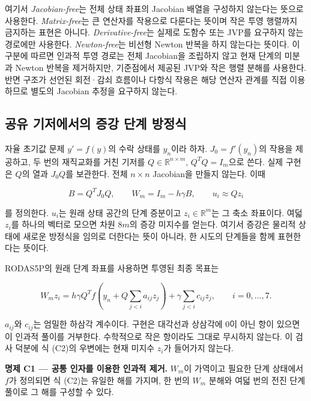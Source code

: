 \documentclass[
  10pt,
  dvipsnames]{article}
\begin{document}
여기서 \emph{Jacobian-free}는 전체 상태 좌표의 Jacobian 배열을 구성하지
않는다는 뜻으로 사용한다. \emph{Matrix-free}는 큰 연산자를 작용으로
다룬다는 뜻이며 작은 투영 행렬까지 금지하는 표현은 아니다.
\emph{Derivative-free}는 실제로 도함수 또는 JVP를 요구하지 않는 경로에만
사용한다. \emph{Newton-free}는 비선형 Newton 반복을 하지 않는다는
뜻이다. 이 구분에 따르면 인과적 투영 경로는 전체 Jacobian을 조립하지
않고 현재 단계의 미분과 Newton 반복을 제거하지만, 기준점에서 제공된
JVP와 작은 행렬 분해를 사용한다. 반면 구조가 선언된 회전·감쇠 흐름이나
다항식 작용은 해당 연산자 관계를 직접 이용하므로 별도의 Jacobian 추정을
요구하지 않는다.

\hypertarget{uxacf5uxc720-uxae30uxc800uxc5d0uxc11cuxc758-uxc99duxac15-uxb2e8uxacc4-uxbc29uxc815uxc2dd}{%
\subsection{공유 기저에서의 증강 단계
방정식}\label{uxacf5uxc720-uxae30uxc800uxc5d0uxc11cuxc758-uxc99duxac15-uxb2e8uxacc4-uxbc29uxc815uxc2dd}}

자율 초기값 문제 \(y'=f(y)\)의 수락 상태를 \(y_n\)이라 하자.
\(J_0=f'(y_n)\)의 작용을 제공하고, 두 번의 재직교화를 거친 기저를
\(Q\in\mathbb R^{n\times m}\), \(Q^TQ=I_m\)으로 쓴다. 실제 구현은
\(Q\)의 열과 \(J_0Q\)를 보관한다. 전체 \(n\times n\) Jacobian을 만들지
않는다. 이때

\[
 B=Q^TJ_0Q,\qquad W_m=I_m-h\gamma B,\qquad u_i\approx Qz_i
 \tag{C1}
\]

를 정의한다. \(u_i\)는 원래 상태 공간의 단계 증분이고
\(z_i\in\mathbb R^m\)는 그 축소 좌표이다. 여덟 \(z_i\)를 하나의 벡터로
모으면 차원 \(8m\)의 증강 미지수를 얻는다. 여기서 증강은 물리적 상태에
새로운 방정식을 임의로 더한다는 뜻이 아니라, 한 시도의 단계들을 함께
표현한다는 뜻이다.

RODAS5P의 원래 단계 좌표를 사용하면 투영된 최종 목표는

\[
 W_m z_i=h\gamma Q^T f\!\left(y_n+Q\sum_{j<i}a_{ij}z_j\right)
       +\gamma\sum_{j<i}c_{ij}z_j,\qquad i=0,\ldots,7.
 \tag{C2}
\]

\(a_{ij}\)와 \(c_{ij}\)는 엄밀한 하삼각 계수이다. 구현은 대각선과
상삼각에 0이 아닌 항이 있으면 이 인과적 풀이를 거부한다. 수학적으로 작은
항이라도 그대로 무시하지 않는다. 이 검사 덕분에 식 (C2)의 우변에는 현재
미지수 \(z_i\)가 들어가지 않는다.

\textbf{명제 C1 --- 공통 인자를 이용한 인과적 제거.} \(W_m\)이 가역이고
필요한 단계 상태에서 \(f\)가 정의되면 식 (C2)는 유일한 해를 가지며, 한
번의 \(W_m\) 분해와 여덟 번의 전진 단계 풀이로 그 해를 구성할 수 있다.
\end{document}
